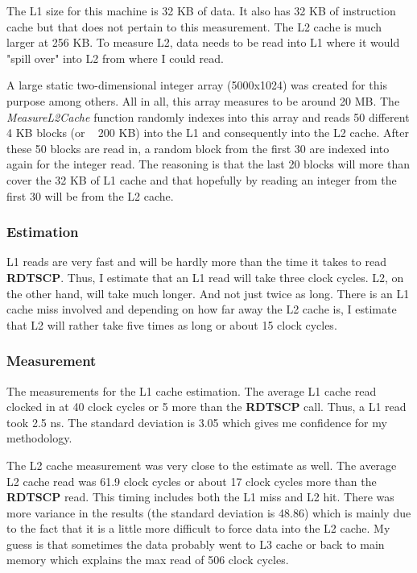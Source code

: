 \documentclass[paper=a4, fontsize=11pt]{scrartcl}
\numberwithin{equation}{section}        %
\numberwithin{figure}{section}          %
\numberwithin{table}{section}               %
\begin{document}
The L1 size for this machine is 32 KB of data.  It also has 32 KB of instruction cache but that does not pertain to this measurement.  The L2 cache is much larger at 256 KB.  To measure L2, data needs to be read into L1 where it would "spill over" into L2 from where I could read.

A large static two-dimensional integer array (5000x1024) was created for this purpose among others.  All in all, this array measures to be around 20 MB. The \textit{MeasureL2Cache} function randomly indexes into this array and reads 50 different 4 KB blocks (or ~ 200 KB) into the L1 and consequently into the L2 cache.  After these 50 blocks are read in, a random block from the first 30 are indexed into again for the integer read.  The reasoning is that the last 20 blocks will more than cover the 32 KB of L1 cache and that hopefully by reading an integer from the first 30 will be from the L2 cache. 

\subsubsection{Estimation}

L1 reads are very fast and will be hardly more than the time it takes to read \textbf{RDTSCP}.  Thus, I estimate that an L1 read will take three clock cycles.  L2, on the other hand, will take much longer.  And not just twice as long.  There is an L1 cache miss involved and depending on how far away the L2 cache is, I estimate that L2 will rather take five times as long or about 15 clock cycles.

\subsubsection{Measurement}

The measurements for the L1 cache estimation.  The average L1 cache read clocked in at 40 clock cycles or 5 more than the \textbf{RDTSCP} call.   Thus, a L1 read took 2.5 ns.  The standard deviation is 3.05 which gives me confidence for my methodology.

The L2 cache measurement was very close to the estimate as well.  The average L2 cache read was 61.9 clock cycles or about 17 clock cycles more than the \textbf{RDTSCP} read.  This timing includes both the L1 miss and L2 hit.  There was more variance in the results (the standard deviation is 48.86) which is mainly due to the fact that it is a little more difficult to force data into the L2 cache.  My guess is that sometimes the data probably went to L3 cache or back to main memory which explains the max read of 506 clock cycles. 
\end{document}
